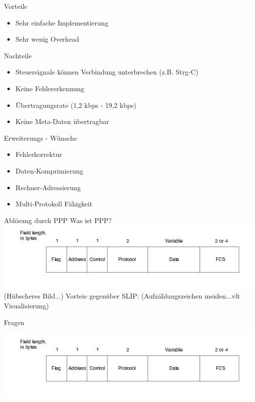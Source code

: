 \documentclass[beamer]{uibk}
\begin{document}
\begin{frame}{}
    \begin{block}{Vorteile}
      \begin{itemize}
        \item Sehr einfache Implementierung
        \item Sehr wenig Overhead
      \end{itemize}
    \end{block}

    \begin{alertblock}{Nachteile}
      \begin{itemize}
        \item Steuersignale können Verbindung unterbrechen (z.B. Strg-C)
        \item Keine Fehlererkennung
        \item Übertragungsrate (1,2 kbps - 19,2 kbps)
        \item Keine Meta-Daten übertragbar
      \end{itemize}
    \end{alertblock}

\end{frame}

\begin{frame}{Erweiterungs - Wünsche}
  \begin{itemize}
    \item Fehlerkorrektur
    \item Daten-Komprimierung
    \item Rechner-Adressierung
    \item Multi-Protokoll Fähigkeit
  \end{itemize}

\end{frame}

\begin{frame}{Ablösung durch PPP}
Was ist PPP?\newline
\includegraphics[scale=0.5]{ppp.jpg}
(Hübscheres Bild...)\newline
Vorteie gegenüber SLIP:\newline
(Aufzählungszeichen meiden...vlt Visualisierung)
\end{frame}

\begin{frame}{Fragen}
\begin{center}
\includegraphics[scale=0.8]{ppp.jpg}
\end{center}

\end{frame}
\end{document}
